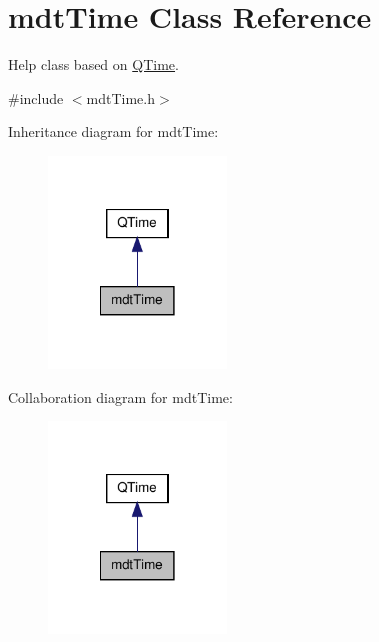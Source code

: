 \hypertarget{classmdt_time}{\section{mdt\-Time Class Reference}
\label{classmdt_time}
}


Help class based on \hyperlink{class_q_time}{Q\-Time}.  




{\ttfamily \#include $<$mdt\-Time.\-h$>$}



Inheritance diagram for mdt\-Time\-:
\nopagebreak
\begin{figure}[H]
\begin{center}
\leavevmode
\includegraphics[width=134pt]{classmdt_time__inherit__graph}
\end{center}
\end{figure}


Collaboration diagram for mdt\-Time\-:
\nopagebreak
\begin{figure}[H]
\begin{center}
\leavevmode
\includegraphics[width=134pt]{classmdt_time__coll__graph}
\end{center}
\end{figure}
